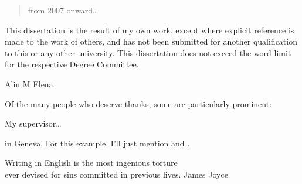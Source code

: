 
\begin{abstract}%
   from 2007 onward\dots
\end{abstract}


\begin{declaration}
  This dissertation is the result of my own work, except where explicit
  reference is made to the work of others, and has not been submitted
  for another qualification to this or any other university. This 
  dissertation does not exceed the word limit for the respective Degree 
  Committee.
  \vspace*{1cm}
  \begin{flushright}
    Alin M Elena
  \end{flushright}
\end{declaration}


\begin{acknowledgements}
  Of the many people who deserve thanks, some are particularly prominent:

  \noindent
  My supervisor\dots
\end{acknowledgements}


\begin{preface}
   in Geneva.  
  \noindent
  For this example, I'll just mention  
  and .
\end{preface}


\printglossaries
\tableofcontents

\frontquote%
  {Writing in English is the most ingenious torture\\ 
   ever devised for sins committed in previous lives.}%
  {James Joyce}
